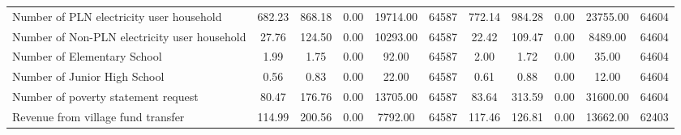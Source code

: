 \begin{tabular}{l*{2}{ccccc}}
\hspace{0.25cm} Number of PLN electricity user household&   682.23&   868.18&     0.00& 19714.00&    64587&   772.14&   984.28&     0.00& 23755.00&    64604\\
\hspace{0.25cm}Number of Non-PLN electricity user household&    27.76&   124.50&     0.00& 10293.00&    64587&    22.42&   109.47&     0.00&  8489.00&    64604\\
\hspace{0.25cm}Number of Elementary School&     1.99&     1.75&     0.00&    92.00&    64587&     2.00&     1.72&     0.00&    35.00&    64604\\
\hspace{0.25cm}Number of Junior High School&     0.56&     0.83&     0.00&    22.00&    64587&     0.61&     0.88&     0.00&    12.00&    64604\\
\hspace{0.25cm}Number of poverty statement request&    80.47&   176.76&     0.00& 13705.00&    64587&    83.64&   313.59&     0.00& 31600.00&    64604\\
\hspace{0.25cm}Revenue from village fund transfer&   114.99&   200.56&     0.00&  7792.00&    64587&   117.46&   126.81&     0.00& 13662.00&    62403\\
\bottomrule
\end{tabular}
